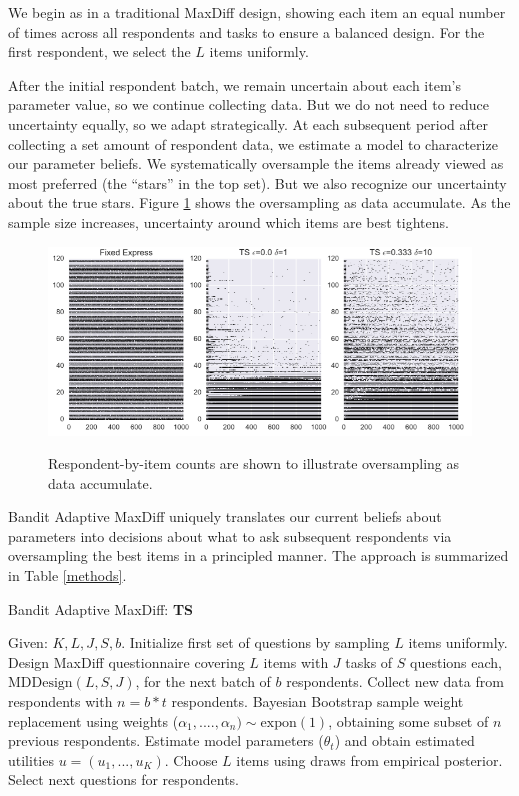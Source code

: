 \documentclass[a4paper,11pt]{article}
\newcommand{\ts}{\textbf{TS} }
\newcommand{\numperset}{L}
\begin{document}
We begin as in a traditional MaxDiff design, showing each item an equal number of times across all respondents and tasks to ensure a balanced design.  For the first respondent, we select the $\numperset$ items uniformly. 

After the initial respondent batch, we remain uncertain about each item's parameter value, so we continue collecting data. But we do not need to reduce uncertainty equally, so we adapt strategically. At each subsequent period after collecting a set amount of respondent data, we estimate a model to characterize our parameter beliefs. We systematically oversample the items already viewed as most preferred (the ``stars'' in the top set). But we also recognize our uncertainty about the true stars. Figure \ref{fig:dots} shows the oversampling as data accumulate. As the sample size increases, uncertainty around which items are best tightens.

\begin{figure}[!ht]
\caption{Respondent-by-item counts are shown to illustrate oversampling as data accumulate.}
\includegraphics[width=1\textwidth]{plots/3dotplot-lowres.png}
\label{fig:dots}
\end{figure}

Bandit Adaptive MaxDiff uniquely translates our current beliefs about parameters into decisions about what to ask subsequent respondents via oversampling the best items in a principled manner. The approach is summarized in Table \ref{methods}.

\begin{algorithm}
\caption{Bandit Adaptive MaxDiff: \ts} \label{alg:ts_simple}
\begin{algorithmic}[1]
\State Given: $K,\numperset,J,S,b$.
\State Initialize first set of questions by sampling $\numperset$ items uniformly.
\State Design MaxDiff questionnaire covering $\numperset$ items with $J$ tasks of $S$ questions each, $\text{MDDesign}(L,S,J)$, for the next batch of $b$ respondents.
\State Collect new data from respondents with $n = b*t$ respondents.
\State Bayesian Bootstrap sample weight replacement using weights ($\alpha_1, ...., \alpha_n)\sim \text{expon}(1)$, obtaining some subset of $n$ previous respondents.
\State Estimate model parameters ($\theta_t$) and obtain estimated utilities $u = (u_1,...,u_K)$.
\State Choose $\numperset$ items using draws from empirical posterior.
\State Select next questions for respondents.
\end{algorithmic}
\end{algorithm}
\end{document}
